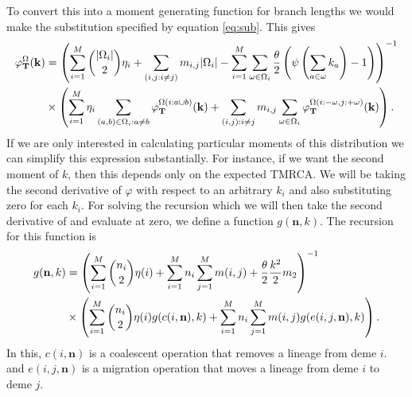 To convert this into a moment generating function for branch lengths we would make the substitution specified by
equation \ref{eq:sub}. This gives 
\begin{align}
  \label{eq:gensub}
  \varphi_{\mathbf{T}}^{\Omega}(\mathbf{k}) &=
  \left( \sum_{i=1}^M \binom{|\Omega_i|}{2}\eta_i  + \sum_{(i,j:i \neq j)} m_{i,j}|\Omega_i| -
  \sum_{i=1}^M \sum_{\omega \in \Omega_i} \frac{\theta}{2}\left( \psi\left(\sum_{a \in \omega}k_{a}\right) -1\right)\right)^{-1} \\
  &\times \left( \sum_{i=1}^M \eta_i \sum_{(a,b) \in \Omega_i:a \neq b}
  \varphi_{\mathbf{T}}^{\Omega(i:a \cup b)}(\mathbf{k}) + 
  \sum_{(i,j):i\neq j}m_{i,j}\sum_{\omega \in \Omega_i} \varphi_{\mathbf{T}}^{\Omega\left( i :-\omega, j: + \omega \right)}(\mathbf{k})\right).
\end{align}
If we are only interested in calculating particular moments of this distribution we can simplify this expression
substantially. For instance, if we want the second moment of $k$, then this depends only on the expected TMRCA. We will
be taking the second derivative of $\varphi$ with respect to an arbitrary $k_i$ and also substituting zero for each
$k_i$. For solving the recursion which we will then take the second derivative of and evaluate at zero, we define a 
function $g(\mathbf{n}, k)$. The recursion for this function is 
\begin{align}
  \label{eq:grecur}
  g(\mathbf{n}, k) &= \left( \sum_{i=1}^M \binom{n_i}{2}\eta(i) + \sum_{i=1}^Mn_i\sum_{j=1}^Mm(i,j) + 
    \frac{\theta}{2} \frac{k^2}{2}m_2 \right)^{-1} \nonumber \\
  &\times \left( \sum_{i=1}^M \binom{n_i}{2} \eta(i) g(c(i,\mathbf{n}), k) + 
  \sum_{i=1}^Mn_i\sum_{j=1}^Mm(i,j)g(e(i,j,\mathbf{n}),k)\right).
\end{align}
In this, $c(i,\mathbf{n})$ is a coalescent operation that removes a lineage from deme $i$. and $e(i,j,\mathbf{n})$ is a
migration operation that moves a lineage from deme $i$ to deme $j$. 

